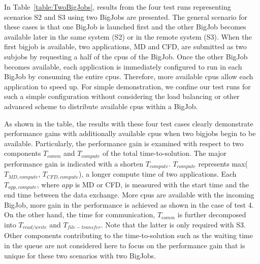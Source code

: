 \documentclass[conference,final]{IEEEtran}
\newcommand{\jhanote}[1]{ {\textcolor{red} { ***Jha: #1 }}}
\newcommand{\jhanote}[1]{}
\begin{document}
In Table~\ref{table:TwoBigJobs}, results from the four test runs representing scenarios S2 and S3 using two BigJobs are presented. 
The general scenario for these cases is that one BigJob is launched first and the other BigJob becomes available later in the same system (S2) or in the remote system (S3).  
When the first bigjob is available, two applications, MD and CFD, are submitted as two subjobs by requesting a half of the cpus of the BigJob. Once the other BigJob becomes available, each application is immediately configured to run in each BigJob by consuming the entire cpus.  Therefore, more available cpus allow each application to speed up.  For simple demonstration, we confine our test runs for such a simple configuration without considering the load balancing or other advanced scheme to distribute available cpus within a BigJob.   

As shown in the table, the results with these four test cases clearly demonstrate performance gains with additionally available cpus when two bigjobs begin to be available.  Particularly, the performance gain is examined with respect to two components ${T_{comm}}$ and
    ${T_{compute}}$ of the total time-to-solution.  The major performance gain is indicated with a
    shorten ${T_{compute}}$.  ${T_{compute}}$ represents max( ${T _{MD,compute}}$, ${T_{CFD,compute}}$), a longer compute time of two applications. Each $T_{app,compute}$, where ${app}$ is MD or CFD, is measured with the start time and the end time between the data exchange.  More cpus are available with the incoming BigJob, more gain in the performance is achieved as shown in the case of test 4.  On the other hand, the time for communication, ${T_{comm}}$
    is further decomposed into ${T_{read/write}}$ and ${T_{file-transfer}}$.  Note that the latter is only required with
    S3.  Other components contributing to the time-to-solution
    such as the waiting time in the queue are not considered here to
    focus on the performance gain that is unique for these two scenarios with two BigJobs. 


\end{document}
